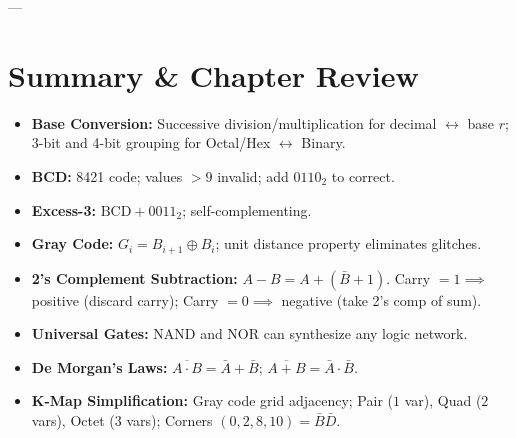 ---

\section{Summary \& Chapter Review}
\begin{quickrevision}
\begin{itemize}
    \item \textbf{Base Conversion:} Successive division/multiplication for decimal $\leftrightarrow$ base $r$; 3-bit and 4-bit grouping for Octal/Hex $\leftrightarrow$ Binary.
    \item \textbf{BCD:} 8421 code; values $>9$ invalid; add $0110_2$ to correct.
    \item \textbf{Excess-3:} $\text{BCD} + 0011_2$; self-complementing.
    \item \textbf{Gray Code:} $G_i = B_{i+1} \oplus B_i$; unit distance property eliminates glitches.
    \item \textbf{2's Complement Subtraction:} $A - B = A + (\bar{B} + 1)$. Carry $= 1 \implies$ positive (discard carry); Carry $= 0 \implies$ negative (take 2's comp of sum).
    \item \textbf{Universal Gates:} NAND and NOR can synthesize any logic network.
    \item \textbf{De Morgan's Laws:} $\overline{A \cdot B} = \bar{A} + \bar{B}$; $\overline{A + B} = \bar{A} \cdot \bar{B}$.
    \item \textbf{K-Map Simplification:} Gray code grid adjacency; Pair ($1$ var), Quad ($2$ vars), Octet ($3$ vars); Corners $(0,2,8,10) = \bar{B}\bar{D}$.
\end{itemize}
\end{quickrevision}
